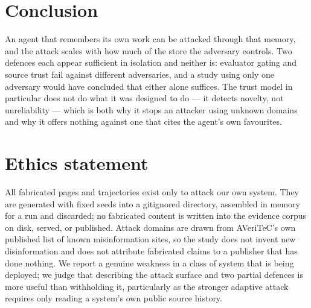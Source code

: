 \documentclass[11pt]{article}
\begin{document}
\section{Conclusion}

An agent that remembers its own work can be attacked through that memory, and
the attack scales with how much of the store the adversary controls. Two
defences each appear sufficient in isolation and neither is: evaluator gating
and source trust fail against different adversaries, and a study using only one
adversary would have concluded that either alone suffices. The trust model in
particular does not do what it was designed to do --- it detects novelty, not
unreliability --- which is both why it stops an attacker using unknown domains
and why it offers nothing against one that cites the agent's own favourites.

\section*{Ethics statement}

All fabricated pages and trajectories exist only to attack our own system. They
are generated with fixed seeds into a gitignored directory, assembled in memory
for a run and discarded; no fabricated content is written into the evidence
corpus on disk, served, or published. Attack domains are drawn from AVeriTeC's
own published list of known misinformation sites, so the study does not invent
new disinformation and does not attribute fabricated claims to a publisher that
has done nothing. We report a genuine weakness in a class of system that is
being deployed; we judge that describing the attack surface and two partial
defences is more useful than withholding it, particularly as the stronger
adaptive attack requires only reading a system's own public source history.



\end{document}
